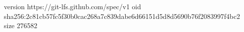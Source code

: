 version https://git-lfs.github.com/spec/v1
oid sha256:2c81cb57fc5f30b0cac268a7c839dabe6d66151d5d8d5690b76f2083997f4bc2
size 276582
